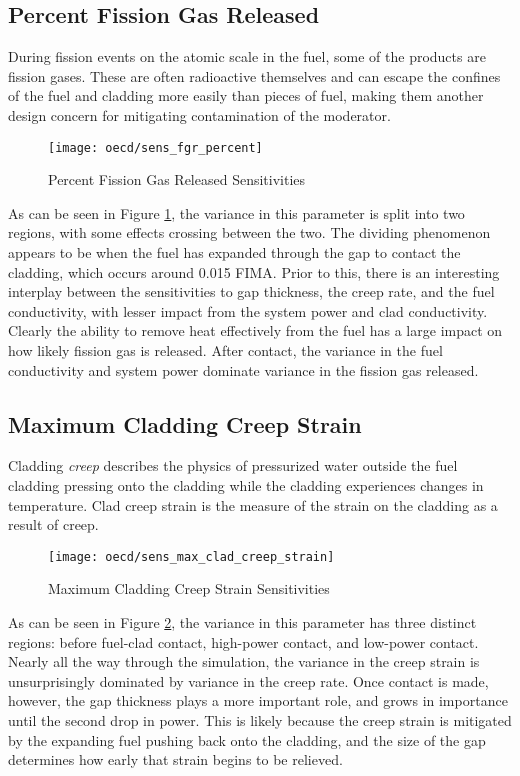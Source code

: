 \subsection{Percent Fission Gas Released}
During fission events on the atomic scale in the fuel, some of the products are fission gases.  These are
often radioactive themselves and can escape the confines of the fuel and cladding more easily than pieces of
fuel, making them another design concern for mitigating contamination of the moderator.
\begin{figure}[H]
  \centering
  \texttt{[image: oecd/sens\_fgr\_percent]}
  \caption{Percent Fission Gas Released Sensitivities}
  \label{fig:oecd fgr}
\end{figure}
As can be seen in Figure \ref{fig:oecd fgr}, the variance in this parameter is split into two regions,
with some effects crossing between the two.  The dividing phenomenon appears to be when the fuel has expanded
through the gap to contact the cladding, which occurs around 0.015 FIMA.  Prior to this, there is an
interesting interplay between the sensitivities to gap thickness, the creep rate, and the fuel conductivity, 
with lesser impact
from the system power and clad conductivity.  Clearly the ability to remove heat effectively from the fuel has
a large impact on how likely fission gas is released.  After contact, the variance in the fuel conductivity
and system power dominate variance in the fission gas released.


\subsection{Maximum Cladding Creep Strain}
Cladding \emph{creep} describes the physics of pressurized water outside the fuel cladding pressing onto the
cladding while the cladding experiences changes in temperature.  Clad creep strain is the measure of the
strain on the cladding as a result of creep.
\begin{figure}[H]
  \centering
  \texttt{[image: oecd/sens\_max\_clad\_creep\_strain]}
  \caption{Maximum Cladding Creep Strain Sensitivities}
  \label{fig:oecd strain}
\end{figure}
As can be seen in Figure \ref{fig:oecd strain}, the variance in this parameter has three distinct regions: before
fuel-clad contact, high-power contact, and low-power contact.  Nearly all the way through the simulation, the
variance in the creep strain is unsurprisingly dominated by variance in the creep rate.  Once contact is made,
however, the gap thickness plays a more important role, and grows in importance until the second drop in
power.  This is likely because the creep strain is mitigated by the expanding fuel pushing back onto the
cladding, and the size of the gap determines how early that strain begins to be relieved.

